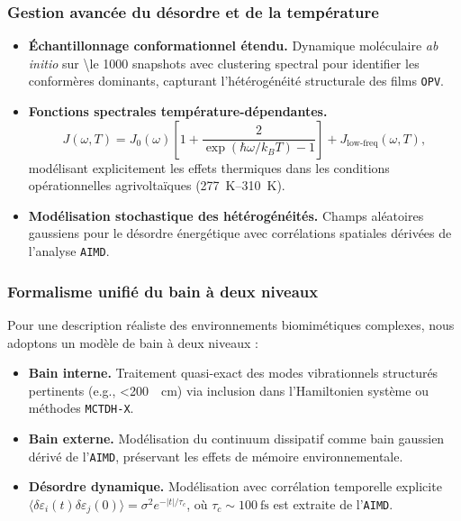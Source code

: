 \documentclass[12pt, a4paper]{article}
\begin{document}
\subsubsection{Gestion avancée du désordre et de la température}

\begin{itemize}
    \item \textbf{Échantillonnage conformationnel étendu.} Dynamique moléculaire \textit{ab initio} sur \num{\le 1000} snapshots avec clustering spectral pour identifier les conformères dominants, capturant l'hétérogénéité structurale des films \texttt{OPV}.
    
    \item \textbf{Fonctions spectrales température-dépendantes.}
    \begin{equation}
    J(\omega, T) = J_0(\omega)\left[1 + \frac{2}{\exp(\hbar\omega/k_B T) - 1}\right] + J_{\text{low-freq}}(\omega, T),
    \end{equation}
    modélisant explicitement les effets thermiques dans les conditions opérationnelles agrivoltaïques (\SIrange{277}{310}{\kelvin}).
    
    \item \textbf{Modélisation stochastique des hétérogénéités.} Champs aléatoires gaussiens pour le désordre énergétique avec corrélations spatiales dérivées de l'analyse \texttt{AIMD}.
\end{itemize}

\subsubsection{Formalisme unifié du bain à deux niveaux}

Pour une description réaliste des environnements biomimétiques complexes, nous adoptons un modèle de bain à deux niveaux :

\begin{itemize}
    \item \textbf{Bain interne.} Traitement quasi-exact des modes vibrationnels structurés pertinents (e.g., \SI{<200}{\per\centi\meter}) via inclusion dans l'Hamiltonien système ou méthodes \texttt{MCTDH-X}.
    
    \item \textbf{Bain externe.} Modélisation du continuum dissipatif comme bain gaussien dérivé de l'\texttt{AIMD}, préservant les effets de mémoire environnementale.
    
    \item \textbf{Désordre dynamique.} Modélisation avec corrélation temporelle explicite $\langle \delta \varepsilon_i(t) \delta \varepsilon_j(0) \rangle = \sigma^2 e^{-|t|/\tau_c}$, où $\tau_c \sim \SI{100}{\femto\second}$ est extraite de l'\texttt{AIMD}.
\end{itemize}
\end{document}

